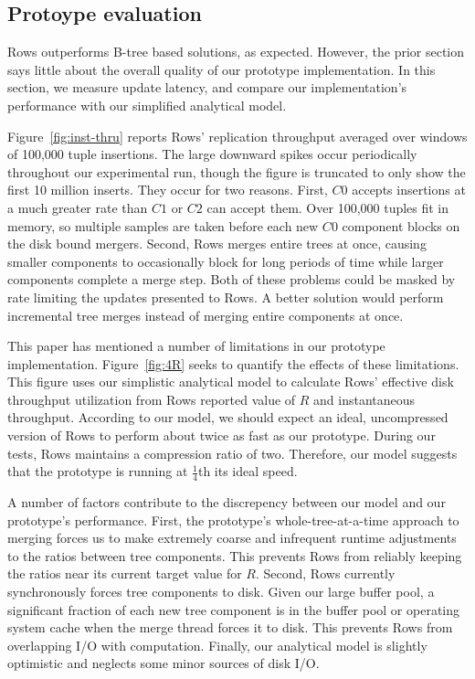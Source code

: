 \documentclass{sig-alternate-sigmod08}
\newcommand{\rows}{Rows\xspace}
\newcommand{\rowss}{Rows'\xspace}
\begin{document}

\subsection{Protoype evaluation}

\rows outperforms B-tree based solutions, as expected.  However, the
prior section says little about the overall quality of our prototype
implementation.  In this section, we measure update latency, and
compare our implementation's performance with our simplified
analytical model.

Figure~\ref{fig:inst-thru} reports \rowss replication throughput
averaged over windows of 100,000 tuple insertions.  The large downward
spikes occur periodically throughout our experimental run, though the
figure is truncated to only show the first 10 million inserts.  They
occur for two reasons.  First, $C0$ accepts insertions at a much
greater rate than $C1$ or $C2$ can accept them.  Over 100,000 tuples
fit in memory, so multiple samples are taken before each new $C0$
component blocks on the disk bound mergers.  Second, \rows merges
entire trees at once, causing smaller components to occasionally block
for long periods of time while larger components complete a merge
step.  Both of these problems could be masked by rate limiting the
updates presented to \rows.  A better solution would perform
incremental tree merges instead of merging entire components at once.

This paper has mentioned a number of limitations in our prototype
implementation.  Figure~\ref{fig:4R} seeks to quantify the effects of
these limitations.  This figure uses our simplistic analytical model
to calculate \rowss effective disk throughput utilization from \rows
reported value of $R$ and instantaneous throughput.  According to our
model, we should expect an ideal, uncompressed version of \rows to
perform about twice as fast as our prototype.  During our tests, \rows
maintains a compression ratio of two.  Therefore, our model suggests
that the prototype is running at $\frac{1}{4}$th its ideal speed.

A number of factors contribute to the discrepency between our model
and our prototype's performance.  First, the prototype's
whole-tree-at-a-time approach to merging forces us to make extremely
coarse and infrequent runtime adjustments to the ratios between tree
components.  This prevents \rows from reliably keeping the ratios near
its current target value for $R$.  Second, \rows currently
synchronously forces tree components to disk.  Given our large buffer
pool, a significant fraction of each new tree component is in the
buffer pool or operating system cache when the merge thread forces it
to disk.  This prevents \rows from overlapping I/O with computation.
Finally, our analytical model is slightly optimistic and neglects some
minor sources of disk I/O.
\end{document}
